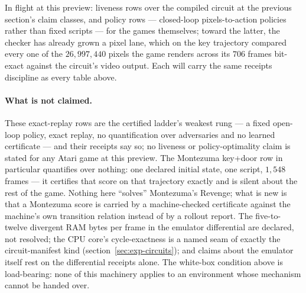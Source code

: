 In flight at this preview: liveness rows over the compiled circuit at
the previous section's claim classes, and policy rows --- closed-loop
pixels-to-action policies rather than fixed scripts --- for the games
themselves; toward the latter, the checker has already grown a pixel
lane, which on the key trajectory compared every one of the
$26{,}997{,}440$ pixels the game renders across its $706$ frames
bit-exact against the circuit's video output.
Each will carry the same receipts discipline as every table above.

\begin{table}[htbp]
\centering\footnotesize
\setlength{\tabcolsep}{5pt}%

\caption{Certified exact-replay rows (worst-case species U1 of
section~\ref{sec:exp-claims}); each environment is the compiled
circuit \texttt{AtariCircuit-}$\langle$game$\rangle$. ``Min return''
is the certified minimum over the row's declared init set
(exact, hence the exact-cell tint of
section~\ref{sec:exp-conventions}) --- all
$31$ no-op offsets, except that the key+door row declares the single
offset $k=0$; the per-offset Montezuma row certifies one separately
searched script per offset. Check times are single-core replay of
the claim's own circuit.}
\label{tab:exp-atari}
\end{table}

\paragraph{What is not claimed.} These exact-replay rows are the
certified ladder's weakest rung --- a fixed open-loop policy, exact replay, no
quantification over adversaries and no learned certificate --- and
their receipts say so; no liveness or policy-optimality claim is
stated for any Atari game at this preview. The Montezuma key+door row
in particular quantifies over nothing: one declared initial state,
one script, $1{,}548$ frames --- it certifies that score on that
trajectory exactly and is silent about the rest of the game. Nothing
here ``solves'' Montezuma's Revenge; what is new is that a Montezuma
score is carried by a machine-checked certificate against the
machine's own transition relation instead of by a rollout report.
The five-to-twelve
divergent RAM bytes per frame in the emulator differential are
declared, not resolved; the CPU core's cycle-exactness is a
named seam of exactly the circuit-manifest kind
(section~\ref{sec:exp-circuits}); and claims about the emulator
itself rest on the differential receipts alone. The white-box
condition above is load-bearing: none of this machinery applies to an
environment whose mechanism cannot be handed over.
